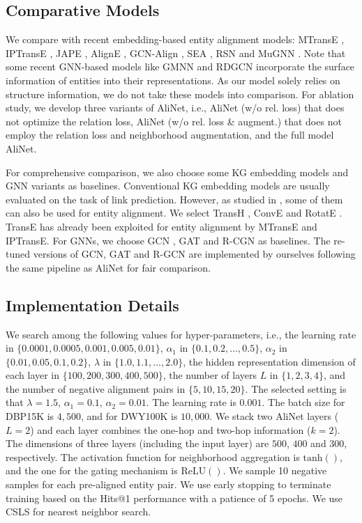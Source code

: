 \documentclass[letterpaper]{article} \usepackage{aaai20}  \usepackage{times}  \usepackage{helvet} \usepackage{courier}  \usepackage[hyphens]{url}  \usepackage{graphicx} \urlstyle{rm} \def\UrlFont{\rm}  \frenchspacing  \setlength{\pdfpagewidth}{8.5in}  \setlength{\pdfpageheight}{11in}  \usepackage{amsmath}
\begin{document}
\subsection{Comparative Models}
We compare with recent embedding-based entity alignment models: MTransE \cite{MTransE}, IPTransE \cite{IPTransE}, JAPE \cite{JAPE}, AlignE \cite{BootEA}, GCN-Align \cite{GCN_Align}, SEA \cite{SEA}, RSN \cite{RSN} and MuGNN \cite{MuGNN}. Note that some recent GNN-based models like GMNN \cite{KGMatching} and RDGCN \cite{RDGCN} incorporate the surface information of entities into their representations. As our model solely relies on structure information, we do not take these models into comparison. For ablation study, we develop three variants of AliNet, i.e., AliNet (w/o rel. loss) that does not optimize the relation loss, AliNet (w/o rel. loss \& augment.) that does not employ the relation loss and neighborhood augmentation, and the full model AliNet.

For comprehensive comparison, we also choose some KG embedding models and GNN variants as baselines. Conventional KG embedding models are usually evaluated on the task of link prediction. However, as studied in \cite{MultiKE}, some of them can also be used for entity alignment. We select TransH \cite{TransH}, ConvE \cite{ConvE} and RotatE \cite{RotatE}. TransE \cite{TransE} has already been exploited for entity alignment by MTransE and IPTransE. For GNNs, we choose GCN \cite{GCN}, GAT \cite{GAT} and R-CGN \cite{R-GCN} as baselines. The re-tuned versions of GCN, GAT and R-GCN are implemented by ourselves following the same pipeline as AliNet for fair comparison. 

\subsection{Implementation Details}
We search among the following values for hyper-parameters, i.e., the learning rate in $\{0.0001,0.0005,0.001,0.005,0.01\}$, $\alpha_1$ in $\{0.1,0.2,\dots,0.5\}$, $\alpha_2$ in $\{0.01,0.05,0.1,0.2\}$, $\lambda$ in $\{1.0,1.1,\dots,2.0\}$, the hidden representation dimension of each layer in $\{100,200,300,400,500\}$, the number of layers $L$ in $\{1,2,3,4\}$, and the number of negative alignment pairs in $\{5,10,15,20\}$. The selected setting is that $\lambda=1.5$, $\alpha_1=0.1$, $\alpha_2=0.01$. The learning rate is $0.001$. The batch size for DBP15K is $4,500$, and for DWY100K is $10,000$. We stack two AliNet layers ($L=2$) and each layer combines the one-hop and two-hop information ($k=2$). The dimensions of three layers (including the input layer) are $500$, $400$ and $300$, respectively. The activation function for neighborhood aggregation is $\text{tanh}()$, and the one for the gating mechanism is $\text{ReLU}()$. We sample 10 negative samples for each pre-aligned entity pair. We use early stopping to terminate training based on the Hits@1 performance with a patience of 5 epochs. We use CSLS \cite{Word_Translation} for nearest neighbor search.
\end{document}

